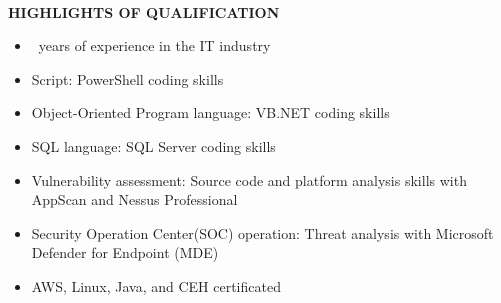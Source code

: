 \begin{center}
    \hrulefill \\
    \begin{large}
        \textbf{HIGHLIGHTS OF QUALIFICATION}
    \end{large}
\end{center}

\begin{itemize}
    \item \FPround{}\workExperience\ years of experience in the IT industry
    \item Script: PowerShell coding skills
    \item Object-Oriented Program language: VB.NET coding skills
    \item SQL language: SQL Server coding skills
    \item Vulnerability assessment: Source code and platform analysis skills with AppScan and Nessus Professional
    \item Security Operation Center(SOC) operation: Threat analysis with Microsoft Defender for Endpoint (MDE)
    \item AWS, Linux, Java, and CEH certificated
\end{itemize}